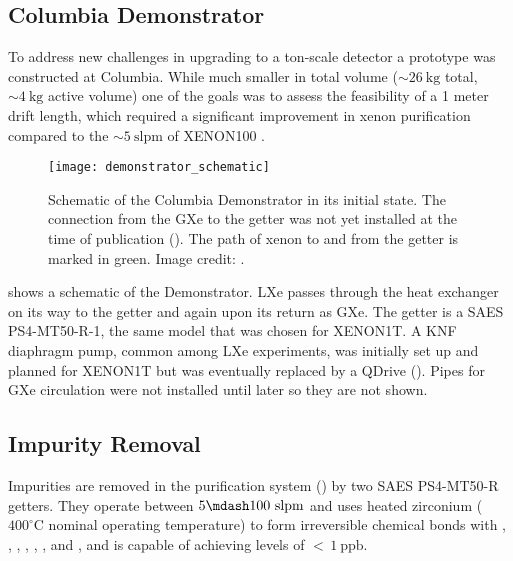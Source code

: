 \subsection{Columbia Demonstrator}
\label{subsec:electron_lifetime_model_demonstrator}
To address new challenges in upgrading to a ton-scale detector a prototype was constructed at Columbia.  While much smaller in total
volume (${\sim}26\ \mathrm{kg}$ total, ${\sim}4\ \mathrm{kg}$ active volume) one of the goals was to assess the feasibility of a 1 meter
drift length, which required a significant improvement in xenon purification compared to the ${\sim}5\ \mathrm{slpm}$ of XENON100
.

\begin{figure}
\centering
\texttt{[image: demonstrator\_schematic]}
\caption{Schematic of the Columbia Demonstrator in its initial state.  The connection from the GXe to the getter was not yet installed
at the time of publication ().  The path of xenon to and from the getter is marked in
green.  Image credit: .}
\label{fig:electron_lifetime_model_demonstrator_schematic}
\end{figure}

 shows a schematic of the Demonstrator.  LXe passes through the heat exchanger
on its way to the getter and again upon its return as GXe.  The getter is a SAES PS4-MT50-R-1, the same model that was chosen for
XENON1T.  A KNF diaphragm pump, common among LXe experiments, was initially set up and planned for XENON1T but was eventually
replaced by a QDrive ().  Pipes for GXe circulation were not installed until later so they are not shown.



\subsection{Impurity Removal}
\label{subsec:electron_lifetime_model_removal}
Impurities are removed in the purification system () by two SAES PS4-MT50-R getters.  They operate between
$5 \mdash 100\ \mathrm{slpm}$ and uses heated zirconium ($400^{\circ}\mathrm{C}$ nominal operating temperature) to form irreversible
chemical bonds with , , , , , , and , and is capable of achieving levels of
${<}\, 1\ \mathrm{ppb}$.

